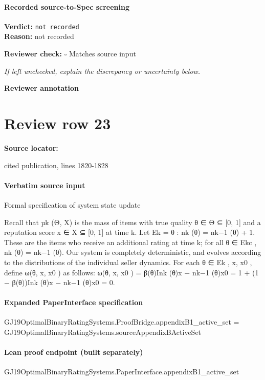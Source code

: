 \documentclass[10pt]{article}
\newcommand{\reviewerbox}{%
  \par\noindent\fbox{\parbox{0.96\linewidth}{\rule{0pt}{0.38in}}}\par
}
\newcommand{\reviewmatch}[1]{%
  \par\noindent\textbf{Reviewer check:} $\square$\; #1\par
  \noindent\emph{If left unchecked, explain the discrepancy or uncertainty below.}\par
}
\begin{document}
\paragraph{Recorded source-to-Spec screening}
\textbf{Verdict:} \texttt{not recorded}
\\
\textbf{Reason:} not recorded
\reviewmatch{Matches source input}
\noindent\textbf{Reviewer annotation}\par
\reviewerbox
\clearpage
\hypertarget{source-claim-ffa7fbb9f1c16e4b}{}
\section*{Review row 23}
\textbf{Source locator:} {\footnotesize\raggedright cited publication, lines 1820-\allowbreak{}1828\par}
\paragraph{Verbatim source input}
\begin{ReviewVerbatim}
Formal specification of system state update

Recall that µk (Θ, X) is the mass of items with true quality θ ∈ Θ ⊆ [0, 1] and a reputation score
x ∈ X ⊆ [0, 1] at time k. Let Ek = {θ : nk (θ) = nk−1 (θ) + 1}. These are the items who receive an
additional rating at time k; for all θ ∈ Ekc , nk (θ) = nk−1 (θ). Our system is completely deterministic,
and evolves according to the distributions of the individual seller dynamics.
For each θ ∈ Ek , x, x0 , define ω(θ, x, x0 ) as follows:
ω(θ, x, x0 ) = β(θ)I{nk (θ)x − nk−1 (θ)x0 = 1} + (1 − β(θ))I{nk (θ)x − nk−1 (θ)x0 = 0}.
\end{ReviewVerbatim}


\paragraph{Expanded PaperInterface specification}
\begin{ReviewVerbatim}
GJ19OptimalBinaryRatingSystems.ProofBridge.appendixB1_active_set =
  GJ19OptimalBinaryRatingSystems.sourceAppendixBActiveSet
\end{ReviewVerbatim}

\paragraph{Lean proof endpoint (built separately)}\begin{ReviewVerbatim}
GJ19OptimalBinaryRatingSystems.PaperInterface.appendixB1_active_set
\end{ReviewVerbatim}
\end{document}
